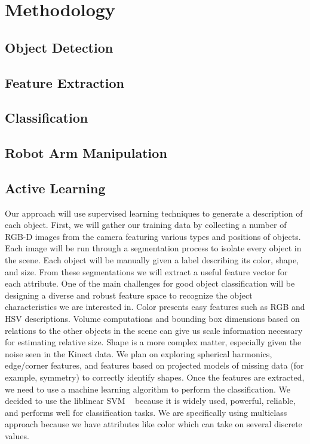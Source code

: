 \documentclass[11pt]{article}
\newcommand{\xxx}[1]{{\bf \color{red} #1}}
\begin{document}
\section{Methodology}

\subsection{Object Detection}

\subsection{Feature Extraction}

\subsection{Classification}

\subsection{Robot Arm Manipulation}

\subsection{Active Learning}

Our approach will use supervised learning techniques to generate a description
of each object. First, we will gather our training data by collecting a number
of RGB-D images from the camera featuring various types and positions of objects.
Each image will be run through a segmentation process to isolate every object in
the scene. Each object will be manually given a label describing its color,
shape, and size. From these segmentations we will extract a useful feature vector
for each attribute. One of the main challenges for good object classification
will be designing a diverse and robust feature space to recognize the object
characteristics we are interested in. Color presents easy features such as RGB
and HSV descriptions. Volume computations and bounding box dimensions based on
relations to the other objects in the scene can give us scale information
necessary for estimating relative size. Shape is a more complex matter,
especially given the noise seen in the Kinect data. We plan on exploring
spherical harmonics, edge/corner features, and features based on projected
models of missing data (for example, symmetry) to correctly identify shapes.
Once the features are extracted, we need to use a machine learning algorithm to
perform the classification. We decided to use the liblinear SVM ~\cite{LIBLINEAR}
because it is widely used, powerful, reliable, and performs well for
classification tasks. We are specifically using multiclass approach because we
have attributes like color which can take on several discrete values.
\end{document}
